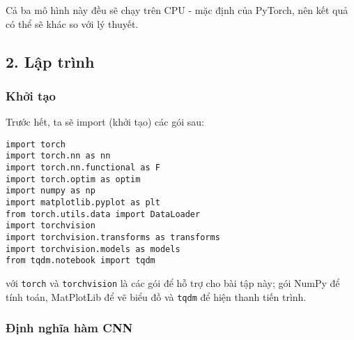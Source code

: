 \documentclass[../main.tex]{subfiles}
\begin{document}
Cả ba mô hình này đều sẽ chạy trên CPU - mặc định của PyTorch, nên kết quả có thể sẽ khác so với lý thuyết.

\subsection*{2. Lập trình}

\subsubsection*{Khởi tạo}

Trước hết, ta sẽ import (khởi tạo) các gói sau:
\begin{verbatim}
import torch
import torch.nn as nn
import torch.nn.functional as F
import torch.optim as optim
import numpy as np
import matplotlib.pyplot as plt
from torch.utils.data import DataLoader
import torchvision
import torchvision.transforms as transforms
import torchvision.models as models
from tqdm.notebook import tqdm
\end{verbatim}

với \verb|torch| và \verb|torchvision| là các gói để hỗ trợ cho bài tập này; gói NumPy để tính toán, MatPlotLib để vẽ biểu đồ và \verb|tqdm| để hiện thanh tiến trình.

\subsubsection*{Định nghĩa hàm CNN}
\end{document}
